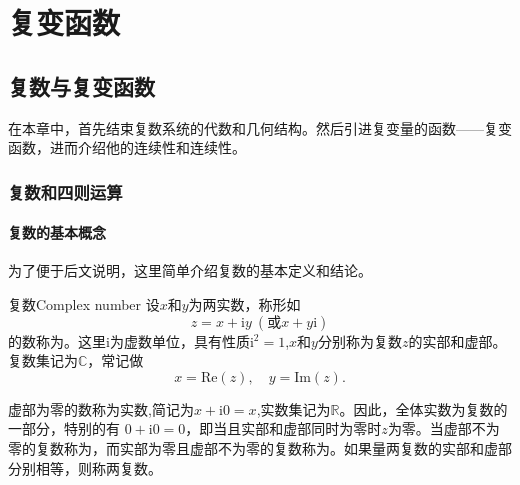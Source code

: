 \chapter{复变函数}

	\section{复数与复变函数}
	在本章中，首先结束复数系统的代数和几何结构。然后引进复变量的函数——复变函数，进而介绍他的连续性和连续性。
	
	\subsection{复数和四则运算}
	
	\subsubsection{复数的基本概念}
	为了便于后文说明，这里简单介绍复数的基本定义和结论。
	\begin{definition}{复数}{Complex number}
	设$x$和$y$为两实数，称形如
	\begin{equation}
	z =  x+\mathrm{i} y ~ (\mbox{或} x+y\mathrm{i})
	\end{equation}
	的数称为。这里$\mathrm{i}$为虚数单位，具有性质$\mathrm{i}^2 = 1$,$x$和$y$分别称为复数$z$的实部和虚部。复数集记为$\mathbb{C}$，常记做
	$$ x = \mathrm{Re}\left(z\right),\quad y =  \mathrm{Im}\left(z\right).$$		
	\end{definition}
	虚部为零的数称为实数,简记为$x + \mathrm{i} 0 = x$,实数集记为$\mathbb{R}$。因此，全体实数为复数的一部分，特别的有
	$0 + \mathrm{i} 0 = 0$，即当且实部和虚部同时为零时$z$为零。当虚部不为零的复数称为，而实部为零且虚部不为零的复数称为。如果量两复数的实部和虚部分别相等，则称两复数。
	
